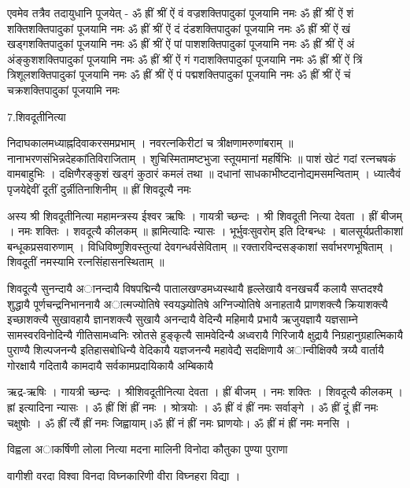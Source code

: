 एवमेव तत्रैव तदायुधानि पूजयेत् -
ॐ ह्रीं श्रीं ऐं वं वज्रशक्तिपादुकां पूजयामि नमः
ॐ ह्रीं श्रीं ऐं शं शक्तिशक्तिपादुकां पूजयामि नमः
ॐ ह्रीं श्रीं ऐं दं दंडशक्तिपादुकां पूजयामि नमः
ॐ ह्रीं श्रीं ऐं खं खड्गशक्तिपादुकां पूजयामि नमः
ॐ ह्रीं श्रीं ऐं पां पाशशक्तिपादुकां पूजयामि नमः
ॐ ह्रीं श्रीं ऐं अं अंङ्कुशशक्तिपादुकां पूजयामि नमः
ॐ ह्रीं श्रीं ऐं गं गदाशक्तिपादुकां पूजयामि नमः
ॐ ह्रीं श्रीं ऐं त्रिं त्रिशूलशक्तिपादुकां पूजयामि नमः
ॐ ह्रीं श्रीं ऐं पं पद्मशक्तिपादुकां पूजयामि नमः
ॐ ह्रीं श्रीं ऐं चं चक्रशक्तिपादुकां पूजयामि नमः

7.शिवदूतीनित्या

निदाघकालमध्याह्नदिवाकरसमप्रभाम् ।
नवरत्नकिरीटां च त्रीक्षणामरुणांबराम् ॥
नानाभरणसंभिन्नदेहकांतिविराजिताम् ।
शुचिस्मितामष्टभुजा स्तूयमानां महर्षिभिः ॥
पाशं खेटं गदां रत्नचषकं वामबाहुभिः ।
दक्षिणैरङ्कुशं खड्गं कुठारं कमलं तथा ॥
दधानां साधकाभीष्टदानोद्यमसमन्विताम् ।
ध्यात्वैवं पृजयेद्देवीं दूतीं दुर्न्नीतिनाशिनीम् ॥
ह्रीं शिवदूत्यै नमः 

अस्य श्री शिवदूतीनित्या महामन्त्रस्य ईश्वर ऋषिः । गायत्री च्छन्दः । श्री शिवदूती नित्या देवता । ह्रीं बीजम् । नमः शक्तिः । शवदूत्यै कीलकम् ॥
ह्रामित्यादिः न्यासः । भूर्भुवःसुवरोम् इति दिग्बन्धः ।
बालसूर्यप्रतीकाशां बन्धूकप्रसवारुणाम् । विधिविष्णुशिवस्तुत्यां देवगन्धर्वसेविताम् ॥
रक्तारविन्दसङ्काशां सर्वाभरणभूषिताम् । शिवदूतीं नमस्यामि रत्नसिंहासनस्थिताम् ॥

शिवदूत्यै सुनन्दायै अानन्दायै विषपद्मिन्यै पातालखण्डमध्यस्थायै हृल्लेखायै वनखचर्यै कलायै सप्तदश्यै शुद्धायै पूर्णचन्द्रनिभाननायै अात्मज्योतिषे स्वयञ्ज्योतिषे अग्निज्योतिषे अनाहतायै प्राणशक्त्यै क्रियाशक्त्यै इच्छाशक्त्यै सुखावहायै ज्ञानशक्त्यै सुखायै अनन्दायै वेदिन्यै महिमायै प्रभायै ऋजुयज्ञायै यज्ञसाम्ने सामस्वरविनोदिन्यै गीतिसामध्वनिः स्रोतसे हुङ्कृत्यै सामवेदिन्यै अध्वरायै गिरिजायै क्षुद्रायै निग्रहानुग्रहात्मिकायै पुराण्यै शिल्पजनन्यै इतिहासबोधिन्यै वेदिकायै यज्ञजनन्यै महावेद्यै सदक्षिणायै अान्वीक्षिक्यै त्रय्यै वार्तायै गोरक्षायै गदितायै कामदायै सर्वकामप्रदायिकायै अम्बिकायै

ऋद्र-ऋषिः । गायत्री च्छन्दः । श्रीशिवदूतीनित्या देवता । ह्रीं बीजम् । नमः शक्तिः । शिवदूत्यै कीलकम् । 
ह्रां इत्यादिना न्यासः ।
ॐ ह्रीं शिं ह्रीं नमः । श्रोत्रयोः । ॐ ह्रीं वं ह्रीं नमः सर्वाङ्गे । ॐ ह्रीं दूं ह्रीं नमः चक्षुषोः । ॐ ह्रीं त्यैं ह्रीं नमः जिह्वायाम्।ॐ ह्रीं नं ह्रीं नमः घ्राणयोः। ॐ ह्रीं मं ह्रीं नमः मनसि । 

विह्वला अाकर्षिणी लोला नित्या मदना मालिनी विनोदा कौतुका पुण्या पुराणा 

वागीशी वरदा विश्वा विनदा विघ्नकारिणी  वीरा विघ्नहरा विद्या ।

